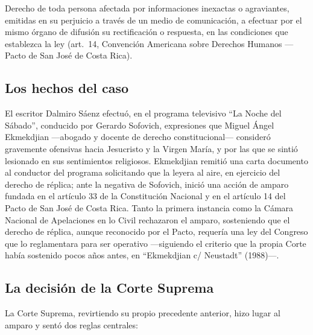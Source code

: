 \documentclass[12pt,oneside]{book}
\begin{document}
\begin{defbox}
Derecho de toda persona afectada por informaciones inexactas o agraviantes,
emitidas en su perjuicio a través de un medio de comunicación, a efectuar por el
mismo órgano de difusión su rectificación o respuesta, en las condiciones que
establezca la ley (art.\ 14, Convención Americana sobre Derechos Humanos ---
Pacto de San José de Costa Rica).
\end{defbox}

\subsection{Los hechos del caso}

El escritor Dalmiro Sáenz efectuó, en el programa televisivo ``La Noche del
Sábado'', conducido por Gerardo Sofovich, expresiones que Miguel Ángel
Ekmekdjian —abogado y docente de derecho constitucional— consideró gravemente
ofensivas hacia Jesucristo y la Virgen María, y por las que se sintió lesionado
en sus sentimientos religiosos. Ekmekdjian remitió una carta documento al
conductor del programa solicitando que la leyera al aire, en ejercicio del
derecho de réplica; ante la negativa de Sofovich, inició una acción de amparo
fundada en el artículo 33 de la Constitución Nacional y en el artículo 14 del
Pacto de San José de Costa Rica. Tanto la primera instancia como la Cámara
Nacional de Apelaciones en lo Civil rechazaron el amparo, sosteniendo que el
derecho de réplica, aunque reconocido por el Pacto, requería una ley del
Congreso que lo reglamentara para ser operativo —siguiendo el criterio que la
propia Corte había sostenido pocos años antes, en ``Ekmekdjian c/ Neustadt''
(1988)—.

\subsection{La decisión de la Corte Suprema}

La Corte Suprema, revirtiendo su propio precedente anterior, hizo lugar al
amparo y sentó dos reglas centrales:
\end{document}
